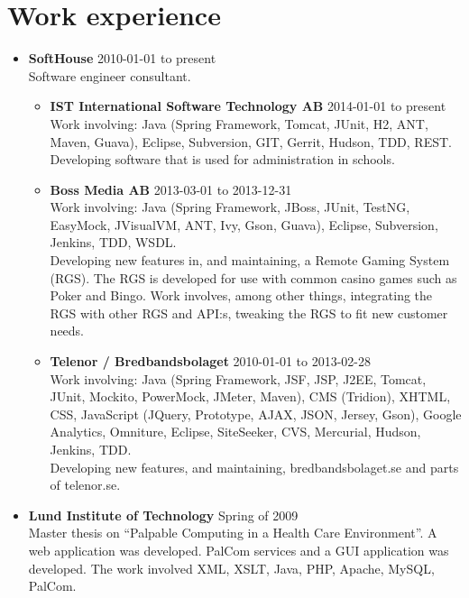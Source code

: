 \documentclass[a4paper]{article}
\begin{document}
\section*{Work experience}
\begin{itemize}
 \item \textbf{SoftHouse} 2010-01-01 to present \\
 Software engineer consultant.
 \begin{itemize}
  \item \textbf{IST International Software Technology AB} 2014-01-01 to present \\
  Work involving: Java (Spring Framework, Tomcat, JUnit, H2, ANT, Maven, Guava), Eclipse, Subversion, GIT, Gerrit, Hudson, TDD, REST. \\
  Developing software that is used for administration in schools.
  
  \item \textbf{Boss Media AB} 2013-03-01 to 2013-12-31 \\
  Work involving: Java (Spring Framework, JBoss, JUnit, TestNG, EasyMock, JVisualVM, ANT, Ivy, Gson, Guava), Eclipse, Subversion, Jenkins, TDD, WSDL. \\
  Developing new features in, and maintaining, a Remote Gaming System (RGS). The RGS is developed for use with common casino games such as Poker and Bingo. Work involves, among other things, integrating the RGS with other RGS and API:s, tweaking the RGS to fit new customer needs.
  
  \item \textbf{Telenor / Bredbandsbolaget} 2010-01-01 to 2013-02-28 \\
  Work involving: Java (Spring Framework, JSF, JSP, J2EE, Tomcat, JUnit, Mockito, PowerMock, JMeter, Maven), CMS (Tridion), XHTML, CSS, JavaScript (JQuery, Prototype, AJAX, JSON, Jersey, Gson), Google Analytics, Omniture, Eclipse, SiteSeeker, CVS, Mercurial, Hudson, Jenkins, TDD. \\
  Developing new features, and maintaining, bredbandsbolaget.se and parts of telenor.se.

 \end{itemize}
 
 \item \textbf{Lund Institute of Technology} Spring of 2009\\
 Master thesis on ``Palpable Computing in a Health Care Environment''. A web application was developed. PalCom services and a GUI application was developed. The work involved XML, XSLT, Java, PHP, Apache, MySQL, PalCom.\\
 

\end{itemize}
\end{document}
